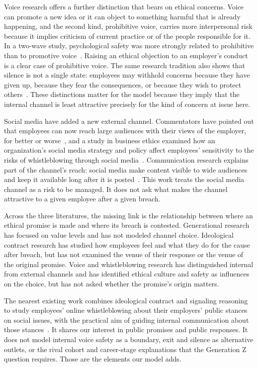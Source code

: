 \documentclass[12pt,a4paper]{article}
\theoremstyle{definition}
\begin{document}
Voice research offers a further distinction that bears on ethical concerns. Voice can promote a new idea or it can object to something harmful that is already happening, and the second kind, prohibitive voice, carries more interpersonal risk because it implies criticism of current practice or of the people responsible for it. In a two-wave study, psychological safety was more strongly related to prohibitive than to promotive voice~\citep{liang2012psychological}. Raising an ethical objection to an employer's conduct is a clear case of prohibitive voice. The same research tradition also shows that silence is not a single state: employees may withhold concerns because they have given up, because they fear the consequences, or because they wish to protect others~\citep{vandyne2003conceptualizing}. These distinctions matter for the model because they imply that the internal channel is least attractive precisely for the kind of concern at issue here.

Social media have added a new external channel. Commentators have pointed out that employees can now reach large audiences with their views of the employer, for better or worse~\citep{miles2014employee}, and a study in business ethics examined how an organization's social media strategy and policy affect employees' sensitivity to the risks of whistleblowing through social media~\citep{xiao2022employee}. Communication research explains part of the channel's reach: social media make content visible to wide audiences and keep it available long after it is posted~\citep{treem2013social}. This work treats the social media channel as a risk to be managed. It does not ask what makes the channel attractive to a given employee after a given breach.

\medskip

Across the three literatures, the missing link is the relationship between where an ethical promise is made and where its breach is contested. Generational research has focused on value levels and has not modeled channel choice. Ideological contract research has studied how employees feel and what they do for the cause after breach, but has not examined the venue of their response or the venue of the original promise. Voice and whistleblowing research has distinguished internal from external channels and has identified ethical culture and safety as influences on the choice, but has not asked whether the promise's origin matters.

The nearest existing work combines ideological contract and signaling reasoning to study employees' online whistleblowing about their employers' public stances on social issues, with the practical aim of guiding internal communication about those stances~\citep{yang2026managing}. It shares our interest in public promises and public responses. It does not model internal voice safety as a boundary, exit and silence as alternative outlets, or the rival cohort and career-stage explanations that the Generation Z question requires. Those are the elements our model adds.
\end{document}
